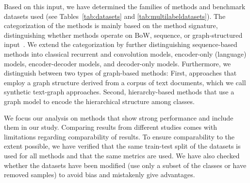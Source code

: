 \documentclass[lettersize,journal]{IEEEtran}
\begin{document}
Based on this input, we have determined the families of methods and benchmark datasets used (see Tables~\ref{tab:datasets} and \ref{tab:multilabeldatasets}).
The categorization of the methods is mainly based on the method signature, distinguishing whether methods operate on BoW, sequence, or graph-structured input~\cite{galkescherp-acl2022}. 
We extend the categorization by further distinguishing 
sequence-based methods into classical recurrent and convolution models, encoder-only (language) models, encoder-decoder models, and decoder-only models.
Furthermore, we distinguish
between two types of graph-based methods: 
First, approaches that employ a graph structure derived from a corpus of text documents, which we call synthetic text-graph approaches. 
Second, hierarchy-based methods that use a graph model to encode the hierarchical structure among classes. 

We focus our analysis on methods that show strong performance and include them in our study.
Comparing results from different studies comes with limitations regarding comparability of results.
To ensure comparability to the extent possible, we have verified that the same train-test split of the datasets is used for all methods and that the same metrics are used.
We have also checked whether the datasets have been modified (\eg use only a subset of the classes or have removed samples) to avoid bias and mistakenly give advantages.
\end{document}
